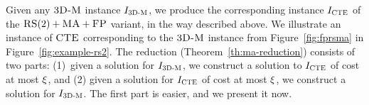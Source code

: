 
 \bigskip
 
 Given any $\textsc{3D-M}$ instance $I_{\mathrm{\textsc{3D-M}}}$, we produce the corresponding instance $I_{\mathrm{\textsc{CTE}}}$ of the $\textsc{RS}(2)+\textsc{MA}+\textsc{FP}$ variant, in the way described above.
 We illustrate an instance of $\textsc{CTE}$ corresponding to the $\textsc{3D-M}$ instance from Figure~\ref{fig:fprsma} in Figure~\ref{fig:example-rs2}.
 The reduction (Theorem~\ref{th:ma-reduction}) consists of two parts: (1)~given a solution for $I_{\mathrm{\textsc{3D-M}}}$, we construct a solution to $I_{\mathrm{\textsc{CTE}}}$ of cost at most $\xi$, and (2) given a solution for $I_{\mathrm{\textsc{CTE}}}$ of cost at most $\xi$, we construct a solution for $I_{\mathrm{\textsc{3D-M}}}$.
 The first part is easier, and we present it now.
 
